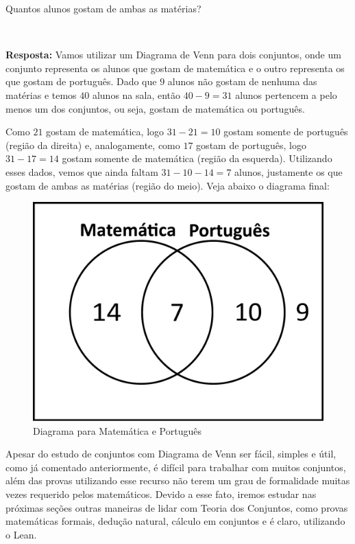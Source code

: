Quantos alunos gostam de ambas as matérias?

$\qquad$

\textbf{Resposta:} Vamos utilizar um Diagrama de Venn para dois conjuntos, onde um conjunto representa os alunos que gostam de matemática e o outro representa os que gostam de português.
Dado que $9$ alunos não gostam de nenhuma das matérias e temos $40$ alunos na sala, então $40-9=31$ alunos pertencem a pelo menos um dos conjuntos, ou seja, gostam de matemática ou português.

Como $21$ gostam de matemática, logo $31-21=10$ gostam somente de português (região da direita) e, analogamente, como $17$ gostam de português, logo $31-17=14$ gostam somente de matemática (região da esquerda). Utilizando esses dados, vemos que ainda faltam $31-10-14=7$ alunos, justamente os que gostam de ambas as matérias (região do meio). Veja abaixo o diagrama final:

\begin{figure}[h!]
  \centering
  \includegraphics[scale=0.3]{figures/sets/fig_sets_03_17.pdf}
  \caption{Diagrama para Matemática e Português}
  \label{fig:sets_03_17}
\end{figure}

Apesar do estudo de conjuntos com Diagrama de Venn ser fácil, simples e útil, como já comentado anteriormente, é difícil para trabalhar com muitos conjuntos, além das provas utilizando esse recurso não terem um grau de formalidade muitas vezes requerido pelos matemáticos. Devido a esse fato, iremos estudar nas próximas seções outras maneiras de lidar com Teoria dos Conjuntos, como provas matemáticas formais, dedução natural, cálculo em conjuntos e é claro, utilizando o Lean.

